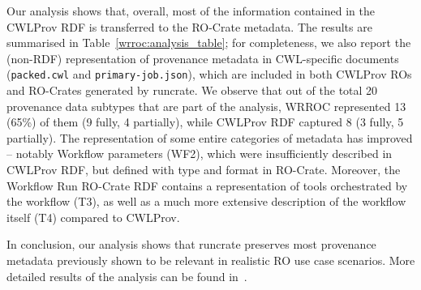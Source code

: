 Our analysis shows that, overall, most of the information contained in the CWLProv RDF is transferred to the RO-Crate metadata.
The results are summarised in Table~\ref{wrroc:analysis_table};
for completeness, we also report the (non-RDF) representation of provenance metadata in CWL-specific documents (\texttt{packed.cwl} and \texttt{primary-job.json}), which are included in both CWLProv ROs and RO-Crates generated by runcrate.
%
We observe that out of the total 20 provenance data subtypes that are part of the analysis, WRROC represented 13 (65\%) of them (9 fully, 4 partially), while CWLProv RDF captured 8 (3 fully, 5 partially).  The representation of some entire categories of metadata has improved -- notably Workflow parameters (WF2), which were insufficiently described in CWLProv RDF, but defined with type and format in RO-Crate.
Moreover, the Workflow Run RO-Crate RDF contains a representation of tools orchestrated by the workflow (T3), as well as a much more extensive description of the workflow itself (T4) compared to CWLProv.

In conclusion, our analysis shows that runcrate preserves most provenance metadata previously shown to be relevant in realistic RO use case scenarios.
More detailed results of the analysis can be found in~\cite{de Wit 2024}. %


